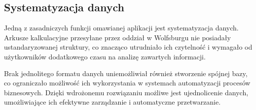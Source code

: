 \subsection{Systematyzacja danych}
Jedną z zasadniczych funkcji omawianej aplikacji jest systematyzacja danych. Arkusze kalkulacyjne przesyłane przez oddział w Wolfsburgu nie posiadały ustandaryzowanej struktury, co znacząco utrudniało ich czytelność i wymagało od użytkowników dodatkowego czasu na analizę zawartych informacji.

Brak jednolitego formatu danych uniemożliwiał również stworzenie spójnej bazy, co ograniczało możliwość ich wykorzystania w systemach automatyzacji procesów biznesowych. Dzięki wdrożonemu rozwiązaniu możliwe jest ujednolicenie danych, umożliwiające ich efektywne zarządzanie i automatyczne przetwarzanie.